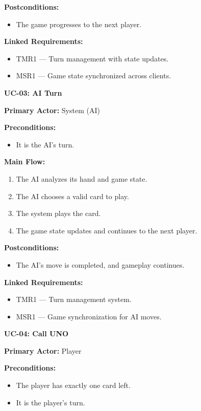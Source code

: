 \documentclass[12pt]{article}
\begin{document}
\textbf{Postconditions:}
\begin{itemize}
    \item The game progresses to the next player.
\end{itemize}

\textbf{Linked Requirements:}
\begin{itemize}
    \item TMR1 — Turn management with state updates.
    \item MSR1 — Game state synchronized across clients.
\end{itemize}

\vspace{0.5cm}

\textbf{UC-03: AI Turn}

\textbf{Primary Actor:} System (AI)

\textbf{Preconditions:}
\begin{itemize}
    \item It is the AI’s turn.
\end{itemize}

\textbf{Main Flow:}
\begin{enumerate}
    \item The AI analyzes its hand and game state.
    \item The AI chooses a valid card to play.
    \item The system plays the card.
    \item The game state updates and continues to the next player.
\end{enumerate}

\textbf{Postconditions:}
\begin{itemize}
    \item The AI’s move is completed, and gameplay continues.
\end{itemize}

\textbf{Linked Requirements:}
\begin{itemize}
    \item TMR1 — Turn management system.
    \item MSR1 — Game synchronization for AI moves.
\end{itemize}

\vspace{0.5cm}

\textbf{UC-04: Call UNO}

\textbf{Primary Actor:} Player

\textbf{Preconditions:}
\begin{itemize}
    \item The player has exactly one card left.
    \item It is the player’s turn.
\end{itemize}
\end{document}

